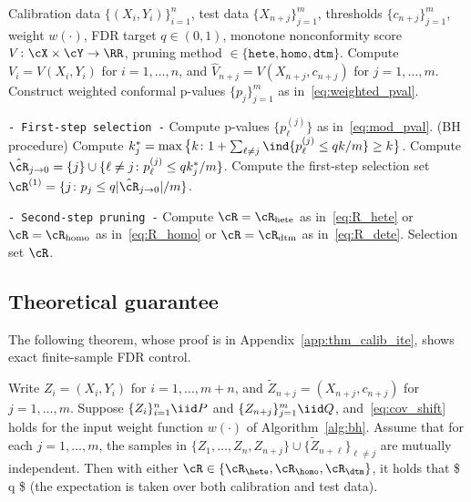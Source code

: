 \begin{algorithm}[h]
  \caption{Weighted Conformalized Selection}\label{alg:bh}
  \begin{algorithmic}[1]
  \REQUIRE Calibration data $\{(X_i,Y_i)\}_{i=1}^n$,
  test data  $\{X_{n+j}\}_{j=1}^m$,
  thresholds $\{c_{n+j}\}_{j=1}^m$,
  weight $w(\cdot)$,
  FDR target $q\in(0,1)$, monotone nonconformity score $V\colon \cX\times\cY\to \RR$,
  pruning method $\in\{\texttt{hete}, \texttt{homo}, \texttt{dtm}\}$.
  \vspace{0.05in}
  \STATE Compute $V_i = V(X_i,Y_i)$ for $i=1,\dots,n$,
  and $\hat{V}_{n+j}= V(X_{n+j},c_{n+j})$ for $j=1,\dots,m$.
  \STATE Construct weighted conformal p-values $\{ p_j\}_{j=1}^m$ as in~\eqref{eq:weighted_pval}.

  \vspace{0.3em}
  \noindent \texttt{- First-step selection -}
  \STATE Compute p-values $\{ {p}_\ell^{(j)}\}$ as in~\eqref{eq:mod_pval}.
  \STATE (BH procedure) Compute $k^*_j = \max\big\{k\colon 1 +\sum_{\ell\neq j} \ind\{{p}_\ell^{(j)}\leq qk/m\}\geq k\big\}$.
  \STATE Compute $\hat{\cR}_{j\to 0} = \{j\}\cup\{\ell \neq j\colon  {p}_\ell^{(j)}\leq q k^*_j /m\}$.
  \ENDFOR
  \STATE Compute the first-step selection set $\cR^{(1)} = \{j\colon  {p}_j \leq q|\hat\cR_{j\to 0}|/m\}$.

  \vspace{0.3em}
  \noindent \texttt{- Second-step pruning -}
  \STATE Compute $\cR = \cR_{\textrm{hete}}$ as in~\eqref{eq:R_hete}
  or $\cR = \cR_{\textrm{homo}}$ as in~\eqref{eq:R_homo}
  or $\cR = \cR_{\textrm{dtm}}$ as in~\eqref{eq:R_dete}.
  \vspace{0.05in}
  \ENSURE Selection set $\cR$.
  \end{algorithmic}
\end{algorithm}


\subsection{Theoretical guarantee}


The following theorem, whose proof is in Appendix~\ref{app:thm_calib_ite}, shows exact finite-sample FDR control.


\begin{theorem}\label{thm:calib_ite}
  Write $Z_i=(X_i,Y_i)$ for $i=1,\dots,m+n$,
  and $\tilde{Z}_{n+j}=(X_{n+j},c_{n+j})$ for $j=1,\dots,m$.  Suppose $\{Z_i\}_{i=1}^n\iid P$
and $\{Z_{n+j}\}_{j=1}^m\iid Q$, and~\eqref{eq:cov_shift} holds
for
the input weight function $w(\cdot)$ of
Algorithm~\ref{alg:bh}.
Assume that for each $j=1,\dots,m$, the samples in  $\{Z_1,\dots,Z_n,Z_{n+j}\}\cup\{\tilde{Z}_{n+\ell}\}_{\ell\neq j}$ are mutually independent.
Then with either
$\cR \in \{\cR_{\hete}, \cR_{\homo}, \cR_{\dtm}\}$, it holds that
\$
\EE\Bigg[  \frac{\sum_{j=1}^m \ind {\{j \in \cR, Y_{n+j}\leq c_{n+j}\}} }{1\vee |\cR|} \Bigg]   \leq q
\$
(the expectation is taken over both calibration and test data).
\end{theorem}


